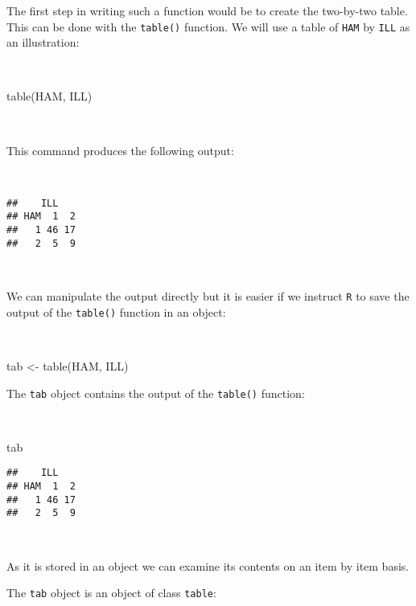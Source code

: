 \documentclass[
  12pt,
  a4paper]{book}
\newenvironment{Shaded}{\begin{snugshade}}{\end{snugshade}}
\newcommand{\FunctionTok}[1]{\textcolor[rgb]{0.00,0.00,0.00}{#1}}
\newcommand{\NormalTok}[1]{#1}
\newcommand{\OtherTok}[1]{\textcolor[rgb]{0.56,0.35,0.01}{#1}}
\begin{document}
The first step in writing such a function would be to create the two-by-two table. This can be done with the \texttt{table()} function. We will use a table of \texttt{HAM} by \texttt{ILL} as an illustration:

~

\begin{Shaded}
\begin{Highlighting}[]
\FunctionTok{table}\NormalTok{(HAM, ILL)}
\end{Highlighting}
\end{Shaded}

~

This command produces the following output:

~

\begin{verbatim}
##    ILL
## HAM  1  2
##   1 46 17
##   2  5  9
\end{verbatim}

~

We can manipulate the output directly but it is easier if we instruct \texttt{R} to save the output of the \texttt{table()} function in an object:

~

\begin{Shaded}
\begin{Highlighting}[]
\NormalTok{tab }\OtherTok{\textless{}{-}} \FunctionTok{table}\NormalTok{(HAM, ILL)}
\end{Highlighting}
\end{Shaded}

\newpage

The \texttt{tab} object contains the output of the \texttt{table()} function:

~

\begin{Shaded}
\begin{Highlighting}[]
\NormalTok{tab}
\end{Highlighting}
\end{Shaded}

\begin{verbatim}
##    ILL
## HAM  1  2
##   1 46 17
##   2  5  9
\end{verbatim}

~

As it is stored in an object we can examine its contents on an item by item basis.

The \texttt{tab} object is an object of class \texttt{table}:

~
\end{document}
